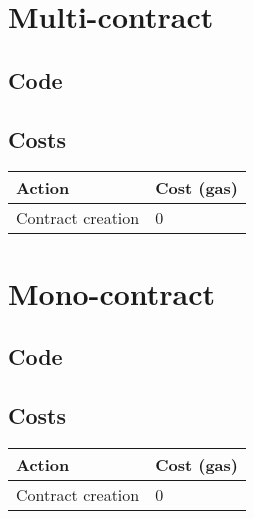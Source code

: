 \documentclass{paper}
\begin{document}
	\section{Multi-contract}

		\subsection{Code}

			

		\subsection{Costs}

			\begin{tabular}{| l | l |}
				\hline
				Action & Cost (gas) \\ \hline
				Contract creation & 0 \\
				\hline
			\end{tabular}

	\section{Mono-contract}

		\subsection{Code}

			

		\subsection{Costs}

			\begin{tabular}{| l | l |}
				\hline
				Action & Cost (gas) \\ \hline
				Contract creation & 0 \\
				\hline
			\end{tabular}
\end{document}
